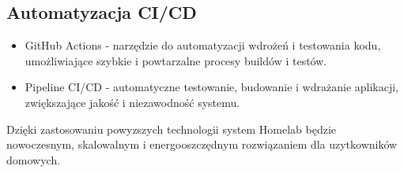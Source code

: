\subsection{Automatyzacja CI/CD}
\begin{itemize}
    \item GitHub Actions - narzędzie do automatyzacji wdrożeń i testowania kodu, umożliwiające szybkie i powtarzalne procesy buildów i testów.
    \item Pipeline CI/CD - automatyczne testowanie, budowanie i wdrażanie aplikacji, zwiększające jakość i niezawodność systemu.
\end{itemize}

Dzięki zastosowaniu powyzszych technologii system Homelab będzie nowoczesnym, skalowalnym i energooszczędnym rozwiązaniem dla uzytkowników domowych.
